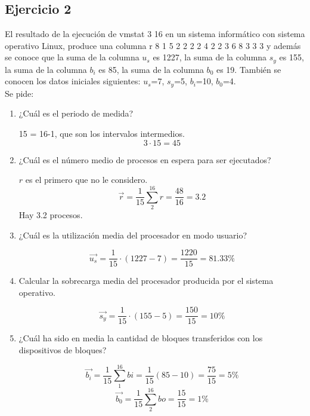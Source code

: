 \subsection{Ejercicio 2}
\noindent
El resultado de la ejecución de vmstat 3 16 en un sistema informático con sistema operativo Linux, produce una columna r 8 1 5 2 2 2 2 4 2 2 3 6 8 3 3 3 y además se conoce que la suma de la columna \textbf{$u_s$} es 1227, la suma de la columna \textbf{$s_y$} es 155, la suma de la columna \textbf{$b_i$} es 85, la suma de la columna \textbf{$b_0$} es 19. También se conocen los datos iniciales siguientes: $u_s$=7, $s_y$=5, $b_i$=10, $b_0$=4.\\
Se pide:
\begin{enumerate}
    \item ¿Cuál es el periodo de medida?
\begin{tcolorbox}[colback=white,colframe=cyan!50!black,fonttitle=\bfseries]
15 = 16-1, que son los intervalos intermedios.
\[
3\cdot 15=45
\]
\end{tcolorbox}    
    \item ¿Cuál es el número medio de procesos en espera para ser ejecutados?
\begin{tcolorbox}[colback=white,colframe=cyan!50!black,fonttitle=\bfseries]
$r$ es el primero que no le considero.
\[
\Vec{r}=\dfrac{1}{15}\sum_{2}^{16}r=\dfrac{48}{16}=3.2
\]
Hay 3.2 procesos.
\end{tcolorbox}    
    \item ¿Cuál es la utilización media del procesador en modo usuario?
\begin{tcolorbox}[colback=white,colframe=cyan!50!black,fonttitle=\bfseries]
\[
\Vec{u_s}=\dfrac{1}{15}\cdot(1227-7)=\dfrac{1220}{15}=81.33\%
\]
\end{tcolorbox}    
    \item Calcular la sobrecarga media del procesador producida por el sistema operativo.
\begin{tcolorbox}[colback=white,colframe=cyan!50!black,fonttitle=\bfseries]
\[
\Vec{s_y}=\dfrac{1}{15}\cdot(155-5)=\dfrac{150}{15}=10\%
\]
\end{tcolorbox}    
    \item ¿Cuál ha sido en media la cantidad de bloques transferidos con los dispositivos de bloques?
\begin{tcolorbox}[colback=white,colframe=cyan!50!black,fonttitle=\bfseries]
\[
\Vec{b_i}=\dfrac{1}{15}\sum_1^{16}bi=\dfrac{1}{15}(85-10)=\dfrac{75}{15}=5\%
\]
\[
\Vec{b_0}=\dfrac{1}{15}\sum_2^{16}bo=\dfrac{15}{15}=1\%
\]
\end{tcolorbox}    
\end{enumerate}
